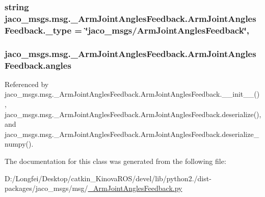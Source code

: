 \subsubsection[{\texorpdfstring{\+\_\+type}{_type}}]{\setlength{\rightskip}{0pt plus 5cm}string jaco\+\_\+msgs.\+msg.\+\_\+\+Arm\+Joint\+Angles\+Feedback.\+Arm\+Joint\+Angles\+Feedback.\+\_\+type = \char`\"{}jaco\+\_\+msgs/{\bf Arm\+Joint\+Angles\+Feedback}\char`\"{}\hspace{0.3cm}{\ttfamily [static]}, {\ttfamily [private]}}\hypertarget{classjaco__msgs_1_1msg_1_1__ArmJointAnglesFeedback_1_1ArmJointAnglesFeedback_a4ce5088bb7de77c9f7d75b98338c8d67}{}\label{classjaco__msgs_1_1msg_1_1__ArmJointAnglesFeedback_1_1ArmJointAnglesFeedback_a4ce5088bb7de77c9f7d75b98338c8d67}
\subsubsection[{\texorpdfstring{angles}{angles}}]{\setlength{\rightskip}{0pt plus 5cm}jaco\+\_\+msgs.\+msg.\+\_\+\+Arm\+Joint\+Angles\+Feedback.\+Arm\+Joint\+Angles\+Feedback.\+angles}\hypertarget{classjaco__msgs_1_1msg_1_1__ArmJointAnglesFeedback_1_1ArmJointAnglesFeedback_a831195e05399bc94228e21684caadea0}{}\label{classjaco__msgs_1_1msg_1_1__ArmJointAnglesFeedback_1_1ArmJointAnglesFeedback_a831195e05399bc94228e21684caadea0}


Referenced by jaco\+\_\+msgs.\+msg.\+\_\+\+Arm\+Joint\+Angles\+Feedback.\+Arm\+Joint\+Angles\+Feedback.\+\_\+\+\_\+init\+\_\+\+\_\+(), jaco\+\_\+msgs.\+msg.\+\_\+\+Arm\+Joint\+Angles\+Feedback.\+Arm\+Joint\+Angles\+Feedback.\+deserialize(), and jaco\+\_\+msgs.\+msg.\+\_\+\+Arm\+Joint\+Angles\+Feedback.\+Arm\+Joint\+Angles\+Feedback.\+deserialize\+\_\+numpy().



The documentation for this class was generated from the following file\+:\begin{DoxyCompactItemize}
\item 
D\+:/\+Longfei/\+Desktop/catkin\+\_\+\+Kinova\+R\+O\+S/devel/lib/python2./dist-\/packages/jaco\+\_\+msgs/msg/\hyperlink{__ArmJointAnglesFeedback_8py}{\+\_\+\+Arm\+Joint\+Angles\+Feedback.\+py}\end{DoxyCompactItemize}
